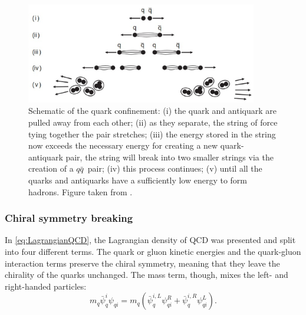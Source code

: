 \begin{figure}[t]
\begin{center}
\includegraphics[width=0.9\textwidth]{Figs/Chapter2/Screenshot_20230220_214232.eps}
\end{center}
\caption{Schematic of the quark confinement: (i) the quark and antiquark are pulled away from each other; (ii) as they separate, the string of force tying together the pair stretches; (iii) the energy stored in the string now exceeds the necessary energy for creating a new quark-antiquark pair, the string will break into two smaller strings via the creation of a $q\bar{q}$~pair; (iv) this process continues; (v) until all the quarks and antiquarks have a sufficiently low energy to form hadrons. Figure taken from \cite{thomsonModernParticlePhysics2013}.}
\label{fig:QuarkFragmentation}
\end{figure}


\subsubsection{Chiral symmetry breaking}
\label{subsubsec:chiralsymmetrybreaking}

In \eq\ref{eq:LagrangianQCD}, the Lagrangian density of QCD was presented and split into four different terms. The quark or gluon kinetic energies and the quark-gluon interaction terms preserve the chiral symmetry, meaning that they leave the chirality of the quarks unchanged. The mass term, though, mixes the left- and right-handed particles:
\begin{equation}
m_{q} \bar{\psi}_{q}^{i} \psi_{qi} = m_{q} \left( \bar{\psi}_{q}^{i, L} \psi_{qi}^{R} + \bar{\psi}_{q}^{i, R} \psi_{qi}^{L} \right).
\label{eq:LagrangianQCDMassTerm}
\end{equation}

